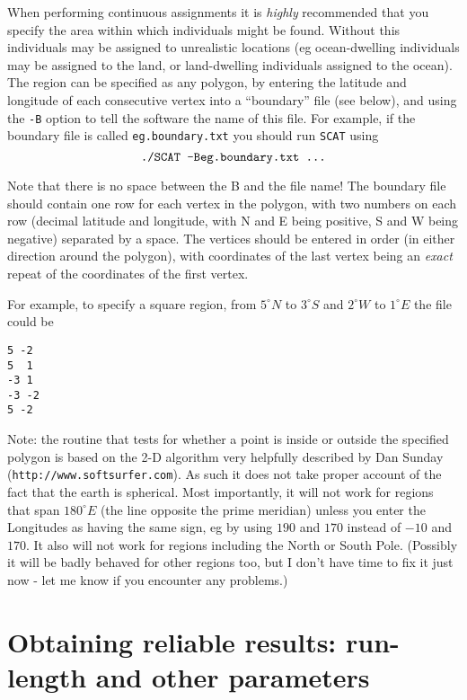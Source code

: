 \documentclass[11pt,titlepage,times,letterpaper]{article}
\def\SCAT{{\tt SCAT} }
\begin{document}
When performing continuous assignments it is {\it highly}
recommended that you specify the area within which individuals might
be found. Without this individuals may be assigned to unrealistic
locations (eg ocean-dwelling individuals may be assigned to the land,
or land-dwelling individuals assigned to the ocean). The region can be
specified as any polygon, by entering the latitude and longitude of
each consecutive vertex into a ``boundary'' file (see below), and using
the {\tt -B} option to tell the software the name of this file.
For example, if the boundary file is called {\tt eg.boundary.txt} you
should run \SCAT using
$$\text{\tt ./SCAT -Beg.boundary.txt ...}$$ 

Note that there is no space between the B and the file name!
The boundary file should contain one row for each vertex in the
polygon, with two numbers on each row (decimal latitude and longitude,
with N and E being positive, S and W being negative) separated by a
space. The vertices should be entered in order (in either direction
around the polygon), with coordinates of the last vertex being an {\it
exact} repeat of the coordinates of the first vertex.

For example, to specify a square region, from $5^\circ N$ to $3^\circ S$ and
$2^\circ W$ to $1^\circ E$ the file could be
\begin{verbatim}
5 -2
5  1
-3 1
-3 -2
5 -2
\end{verbatim}

Note: the routine that tests for whether a point is inside or outside
the specified polygon is based on the 2-D algorithm very helpfully
described by Dan Sunday ({\tt http://www.softsurfer.com}). As such it
does not take proper account of the fact that the earth is
spherical. Most importantly, it will not work for regions that span
$180^\circ E$ (the line opposite the prime meridian) unless you enter
the Longitudes as having the same sign, eg by using $190$ and $170$
instead of $-10$ and $170$. It also will not work for regions
including the North or South Pole.  (Possibly it will be badly behaved
for other regions too, but I don't have time to fix it just now - let
me know if you encounter any problems.)


\section{Obtaining reliable results: run-length and other parameters}
\label{HowLong}
\end{document}
